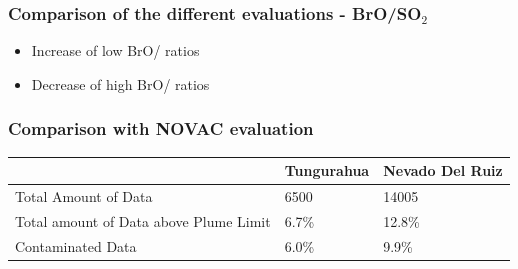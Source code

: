 \documentclass{beamer} %
\begin{document}
		\begin{frame}
			\frametitle{\color{mygreen}Comparison of the different evaluations - BrO/SO$_2$\\%
				\color{mygreen}{\rule{0.8\textwidth}{2pt}}}
			\begin{figure}[h!]	
			\end{figure}
			\begin{multicols}{2}
				\begin{itemize}
					\item Increase of low BrO/ ratios
					\item Decrease of high BrO/ ratios
				\end{itemize}
			\end{multicols}
		\end{frame}
		
		\begin{frame}
			\frametitle{\color{mygreen}Comparison with NOVAC evaluation\\%
				\color{mygreen}{\rule{0.8\textwidth}{2pt}}}
			\begin{table}
				\begin{tabular}{p{3.5cm}p{2cm}p{3cm}}
					&Tungurahua&Nevado Del Ruiz\\
					\toprule
					Total Amount of Data&6500&14005\\
					\midrule
					Total amount of Data above Plume Limit&6.7\%&12.8\%\\
					\midrule
					Contaminated Data &6.0\%&9.9\%\\
					\bottomrule			
				\end{tabular}
			\end{table}
		\end{frame}
		
\end{document}
